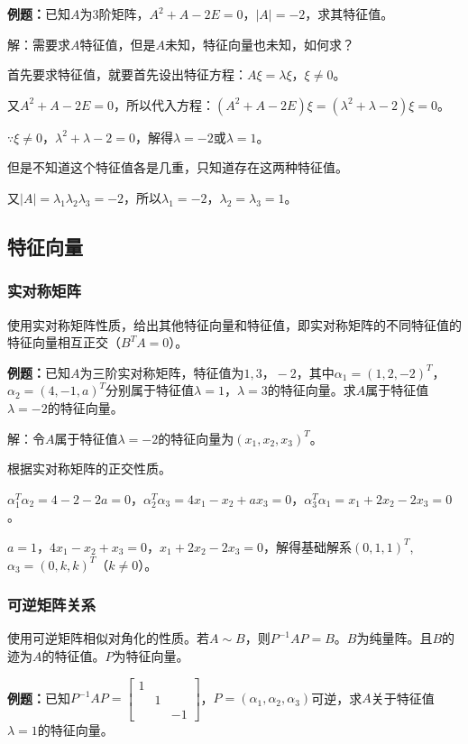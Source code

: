 \documentclass[UTF8, 12pt]{ctexart}
\begin{document}
\textbf{例题：}已知$A$为3阶矩阵，$A^2+A-2E=0$，$\vert A\vert=-2$，求其特征值。

解：需要求$A$特征值，但是$A$未知，特征向量也未知，如何求？

首先要求特征值，就要首先设出特征方程：$A\xi=\lambda\xi$，$\xi\neq0$。

又$A^2+A-2E=0$，所以代入方程：$(A^2+A-2E)\xi=(\lambda^2+\lambda-2)\xi=0$。

$\because\xi\neq0$，$\lambda^2+\lambda-2=0$，解得$\lambda=-2$或$\lambda=1$。

但是不知道这个特征值各是几重，只知道存在这两种特征值。

又$\vert A\vert=\lambda_1\lambda_2\lambda_3=-2$，所以$\lambda_1=-2$，$\lambda_2=\lambda_3=1$。

\subsection{特征向量}

\subsubsection{实对称矩阵}

使用实对称矩阵性质，给出其他特征向量和特征值，即实对称矩阵的不同特征值的特征向量相互正交（$B^TA=0$）。

\textbf{例题：}已知$A$为三阶实对称矩阵，特征值为$1,3，-2$，其中$\alpha_1=(1,2,-2)^T$，$\alpha_2=(4,-1,a)^T$分别属于特征值$\lambda=1$，$\lambda=3$的特征向量。求$A$属于特征值$\lambda=-2$的特征向量。

解：令$A$属于特征值$\lambda=-2$的特征向量为$(x_1,x_2,x_3)^T$。

根据实对称矩阵的正交性质。

$\alpha_1^T\alpha_2=4-2-2a=0$，$\alpha_2^T\alpha_3=4x_1-x_2+ax_3=0$，$\alpha_3^T\alpha_1=x_1+2x_2-2x_3=0$。

$a=1$，$4x_1-x_2+x_3=0$，$x_1+2x_2-2x_3=0$，解得基础解系$(0,1,1)^T$,$\alpha_3=(0,k,k)^T$（$k\neq0$）。

\subsubsection{可逆矩阵关系}

使用可逆矩阵相似对角化的性质。若$A\sim B$，则$P^{-1}AP=B$。$B$为纯量阵。且$B$的迹为$A$的特征值。$P$为特征向量。\medskip

\textbf{例题：}已知$P^{-1}AP=\left[\begin{array}{ccc}
    1 \\
     & 1 \\
     & & -1
\end{array}\right]$，$P=(\alpha_1,\alpha_2,\alpha_3)$可逆，求$A$关于特征值$\lambda=1$的特征向量。
\end{document}

